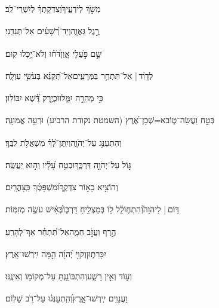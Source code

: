 \documentclass[12pt]{article}
\newcommand{\loc}[1]{\textsuperscript{\locf{#1}}}
\begin{document}
{\loc{ יא}~}‏מְשֹׁ֣ךְ  לְיֹדְעֶ֑יךָ{\hfill}וְ֝צִדְקָתְךָ֗ לְיִשְׁרֵי־לֵֽב׃\par

{\loc{ יב}~}‏ רֶ֣גֶל גַּאֲוָ֑ה{\hfill}וְיַד־רְ֝שָׁעִ֗ים אַל־תְּנִדֵֽנִי׃\par

{\loc{ יג}~}‏שָׁ֣ם  פֹּ֣עֲלֵי אָ֑וֶן{\hfill}דֹּ֝ח֗וּ וְלֹא־יָ֥כְלוּ קֽוּם׃\par\pend
\ledpb
\pstart[\subsection*{\textcolor{red}{פרק לז}}]\label{פרק לז}
{\loc{ א}~}‏לְדָוִ֨ד |  אַל־תִּתְחַ֥ר בַּמְּרֵעִ֑ים{\hfill}אַל־תְּ֝קַנֵּ֗א בְּעֹשֵׂ֥י עַוְלָֽה׃\par

{\loc{ ב}~}‏כִּ֣י  מְהֵרָ֣ה יִמָּ֑לוּ{\hfill}וּכְיֶ֥רֶק דֶּ֝֗שֶׁא יִבּוֹלֽוּן׃\par

{\loc{ ג}~}‏בְּטַ֣ח  וַעֲשֵׂה־ט֑וֹב{\hfill}א=שְׁכָן־אֶ֝רֶץ (השמטת נקודת הרביע) וּרְעֵ֥ה אֱמוּנָֽה׃\par

{\loc{ ד}~}‏וְהִתְעַנַּ֥ג עַל־יְהֹוָ֑ה{\hfill}וְיִֽתֶּן־לְ֝ךָ֗ מִשְׁאֲלֹ֥ת לִבֶּֽךָ׃\par

{\loc{ ה}~}‏גּ֣וֹל עַל־יְהֹוָ֣ה דַּרְכֶּ֑ךָ{\hfill}וּבְטַ֥ח עָ֝לָ֗יו וְה֣וּא יַעֲשֶֽׂה׃\par

{\loc{ ו}~}‏וְהוֹצִ֣יא כָא֣וֹר צִדְקֶ֑ךָ{\hfill}וּ֝מִשְׁפָּטֶ֗ךָ כַּֽצָּהֳרָֽיִם׃\par

{\loc{ ז}~}‏דּ֤וֹם |  לַיהֹוָה֮{\hfill}וְהִתְח֢וֹלֵֽ֫ל ל֥וֹ\newline\hspace*{.5em} בְּמַצְלִ֣יחַ דַּרְכּ֑וֹ{\hfill}בְּ֝אִ֗ישׁ עֹשֶׂ֥ה מְזִמּֽוֹת׃\par

{\loc{ ח}~}‏הֶ֣רֶף  וַעֲזֹ֣ב חֵמָ֑ה{\hfill}אַל־תִּ֝תְחַ֗ר אַךְ־לְהָרֵֽעַ׃\par

{\loc{ ט}~}‏ יִכָּרֵת֑וּן{\hfill}וְקֹוֵ֥י יְ֝הֹוָ֗ה הֵ֣מָּה יִֽירְשׁוּ־אָֽרֶץ׃\par

{\loc{ י}~}‏וְע֣וֹד  וְאֵ֣ין רָשָׁ֑ע{\hfill}וְהִתְבּוֹנַ֖נְתָּ עַל־מְקוֹמ֣וֹ וְאֵינֶֽנּוּ׃\par

{\loc{ יא}~}‏וַעֲנָוִ֥ים יִֽירְשׁוּ־אָ֑רֶץ{\hfill}וְ֝הִֽתְעַנְּג֗וּ עַל־רֹ֥ב שָׁלֽוֹם׃\par
\end{document}
